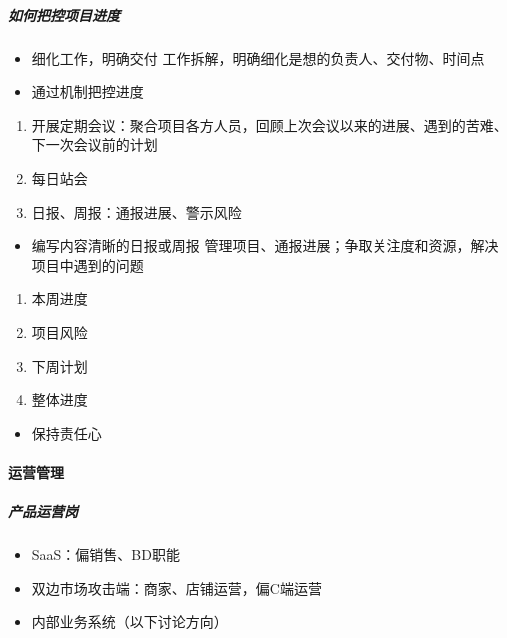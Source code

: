\documentclass[letterpaper,10pt,english]{sphinxmanual}
\begin{document}
\subparagraph{如何把控项目进度}
\label{\detokenize{chapter_introduction/2B:id24}}\begin{itemize}
\item {} 
细化工作，明确交付 工作拆解，明确细化是想的负责人、交付物、时间点

\item {} 
通过机制把控进度

\end{itemize}
\begin{enumerate}
%
\item {} 
开展定期会议：聚合项目各方人员，回顾上次会议以来的进展、遇到的苦难、下一次会议前的计划

\item {} 
每日站会

\item {} 
日报、周报：通报进展、警示风险

\end{enumerate}
\begin{itemize}
\item {} 
编写内容清晰的日报或周报
管理项目、通报进展；争取关注度和资源，解决项目中遇到的问题

\end{itemize}
\begin{enumerate}
%
\item {} 
本周进度

\item {} 
项目风险

\item {} 
下周计划

\item {} 
整体进度

\end{enumerate}
\begin{itemize}
\item {} 
保持责任心

\end{itemize}


\paragraph{运营管理}
\label{\detokenize{chapter_introduction/2B:id25}}

\subparagraph{产品运营岗}
\label{\detokenize{chapter_introduction/2B:id26}}\begin{itemize}
\item {} 
SaaS：偏销售、BD职能

\item {} 
双边市场攻击端：商家、店铺运营，偏C端运营

\item {} 
内部业务系统（以下讨论方向）

\end{itemize}
\end{document}
